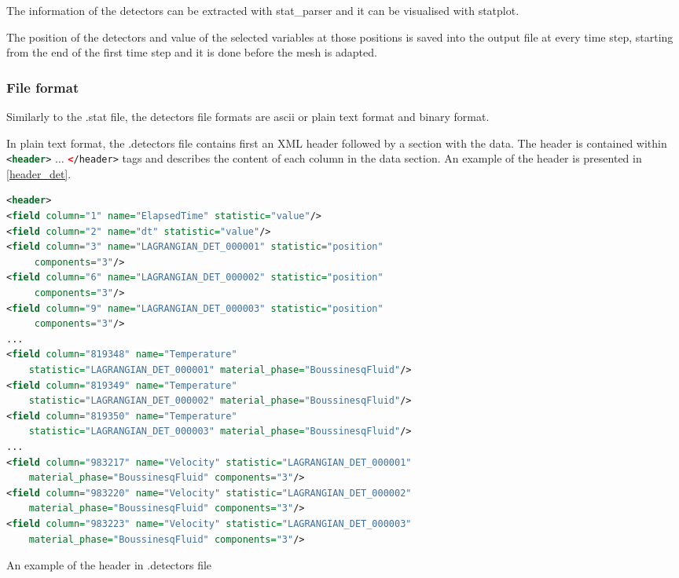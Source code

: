 The information of the detectors can be extracted with stat\_parser and it can be visualised with statplot. 

The position of the detectors and value of the selected variables at those positions is saved into the output file at every time step, starting from the end of the first time step and it is done before the mesh is adapted. 

\subsubsection{File format}
\label{sect:detectors_output}
Similarly to the .stat file, the detectors file formats are ascii or plain text format and binary format.

In plain text format, the .detectors file contains first an XML header followed by a section with the data. The header is contained within \lstinline[language = XML]*<header>* $\ldots$
\lstinline[language = XML]*</header>* tags and describes the content of each column in the data section. An example of the header is presented in \ref{header_det}.

\begin{example}
\begin{lstlisting}[language = XML]
<header>
<field column="1" name="ElapsedTime" statistic="value"/>
<field column="2" name="dt" statistic="value"/>
<field column="3" name="LAGRANGIAN_DET_000001" statistic="position" 
     components="3"/>
<field column="6" name="LAGRANGIAN_DET_000002" statistic="position" 
     components="3"/>
<field column="9" name="LAGRANGIAN_DET_000003" statistic="position" 
     components="3"/>
...
<field column="819348" name="Temperature" 
    statistic="LAGRANGIAN_DET_000001" material_phase="BoussinesqFluid"/>
<field column="819349" name="Temperature" 
    statistic="LAGRANGIAN_DET_000002" material_phase="BoussinesqFluid"/>
<field column="819350" name="Temperature" 
    statistic="LAGRANGIAN_DET_000003" material_phase="BoussinesqFluid"/>
...
<field column="983217" name="Velocity" statistic="LAGRANGIAN_DET_000001" 
    material_phase="BoussinesqFluid" components="3"/>
<field column="983220" name="Velocity" statistic="LAGRANGIAN_DET_000002" 
    material_phase="BoussinesqFluid" components="3"/>
<field column="983223" name="Velocity" statistic="LAGRANGIAN_DET_000003" 
    material_phase="BoussinesqFluid" components="3"/>
\end{lstlisting}

\caption{An example of the header in .detectors file}
\label{header_det}
\end{example}


